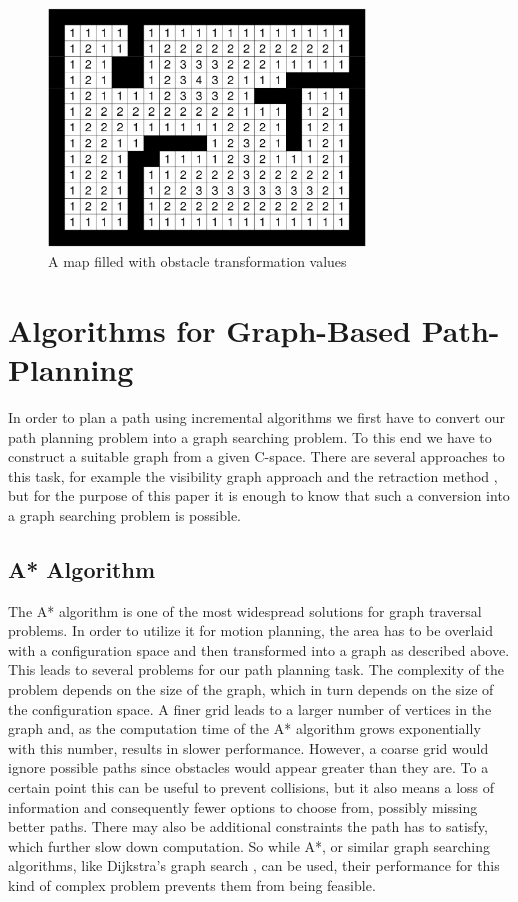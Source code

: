 \begin{figure}[b]
\centering
\includegraphics[width=0.75\textwidth]{./Chapters/Figures/obstacle_transformation.png}
\caption{A map filled with obstacle transformation values\label{pic:obstacle_transformation}}
\end{figure}

\section{Algorithms for Graph-Based Path-Planning}
\label{sec:graphbased_pathplanning}

In order to plan a path using incremental algorithms we first have to convert our path planning problem into a graph searching problem. To this end we have to construct a suitable graph from a given C-space. There are several approaches to this task, for example the visibility graph approach \cite{2,3} and the retraction method \cite{4,5}, but for the purpose of this paper it is enough to know that such a conversion into a graph searching problem is possible. 

\subsection{A* Algorithm}
\label{sec:a_star}

The A* algorithm is one of the most widespread solutions for graph traversal problems.\cite{8} In order to utilize it for motion planning, the area has to be overlaid with a configuration space and then transformed into a graph as described above. This leads to several problems for our path planning task. The complexity of the problem depends on the size of the graph, which in turn depends on the size of the configuration space. A finer grid leads to a larger number of vertices in the graph and, as the computation time of the A* algorithm grows exponentially with this number, results in slower performance. However, a coarse grid would ignore possible paths since obstacles would appear greater than they are. To a certain point this can be useful to prevent collisions, but it also means a loss of information and consequently fewer options to choose from, possibly missing better paths. There may also be additional constraints the path has to satisfy, which further slow down computation. So while A*, or similar graph searching algorithms, like Dijkstra's graph search \cite{6}, can be used, their performance for this kind of complex problem prevents them from being feasible.


